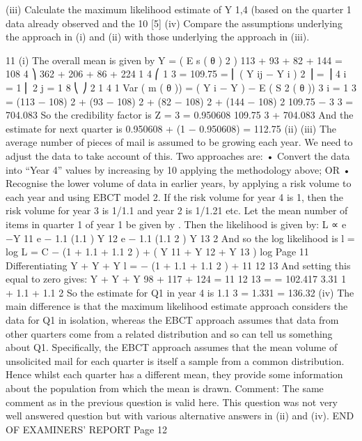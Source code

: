 \documentclass[a4paper,12pt]{article}
\begin{document}
(iii) Calculate the maximum likelihood estimate of Y 1,4 (based on the quarter 1 data already observed and the 10%
[5]
(iv) Compare the assumptions underlying the approach in (i) and (ii) with those underlying the approach in (iii).







11
(i)
The overall mean is given by Y =
(
E s ( θ )
2
)
113 + 93 + 82 + 144
= 108
4
⎞ 362 + 206 + 86 + 224
1 4 ⎛ 1 3
= 109.75
= \sum ⎜ \sum ( Y ij − Y i ) 2 ⎟ =
⎟
4 i = 1 ⎜ 2 j = 1
8
⎝
⎠
2
1 4
1
Var ( m ( θ )) = \sum ( Y i − Y ) − E ( S 2 ( θ ))
3 i = 1
3
=
(113 − 108) 2 + (93 − 108) 2 + (82 − 108) 2 + (144 − 108) 2 109.75
−
3
3
= 704.083
So the credibility factor is Z =
3
= 0.950608
109.75
3 +
704.083
And the estimate for next quarter is
0.950608  + (1 − 0.950608)  = 112.75
(ii)
(iii)
The average number of pieces of mail is assumed to be growing each year.
We need to adjust the data to take account of this. Two approaches are:
• Convert the data into “Year 4” values by increasing by 10%
applying the methodology above; OR
• Recognise the lower volume of data in earlier years, by applying a risk
volume to each year and using EBCT model 2. If the risk volume for year
4 is 1, then the risk volume for year 3 is 1/1.1 and year 2 is 1/1.21 etc.
Let the mean number of items in quarter 1 of year 1 be given by \lambda . Then the
likelihood is given by:
L ∝ e −\lambda \lambda Y 11 e − 1.1 \lambda (1.1 \lambda ) Y 12 e − 1.1 \lambda (1.1 2 \lambda ) Y 13
2
And so the log likelihood is
l = log L = C − \lambda (1 + 1.1 + 1.1 2 ) + ( Y 11 + Y 12 + Y 13 ) log \lambda
Page 11%
Differentiating
Y + Y + Y
\frac{\partial}{\partial}  l
= − (1 + 1.1 + 1.1 2 ) + 11 12 13
\frac{\partial}{\partial} \lambda
\lambda
And setting this equal to zero gives:
Y + Y + Y
98 + 117 + 124
 = 11 12 13
=
= 102.417
3.31
1 + 1.1 + 1.1 2
So the estimate for Q1 in year 4 is 1.1 3 \times {} = 1.331  = 136.32
(iv)
The main difference is that the maximum likelihood estimate approach considers the data for Q1 in isolation, whereas the EBCT approach assumes
that data from other quarters come from a related distribution and so can tell us something about Q1.
Specifically, the EBCT approach assumes that the mean volume of unsolicited mail for each quarter is itself a sample from a common distribution. Hence
whilst each quarter has a different mean, they provide some information about the population from which the mean is drawn.
Comment: The same comment as in the previous question is valid here. This question was
not very well answered question but with various alternative answers in (ii) and (iv).
END OF EXAMINERS’ REPORT
Page 12
\end{document}
